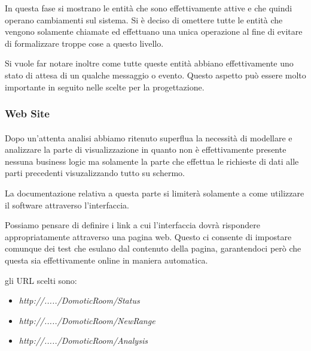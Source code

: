 In questa fase si mostrano le entit\`a che sono effettivamente attive e che quindi operano cambiamenti sul sistema. Si \`e deciso di omettere tutte le entit\`a che vengono solamente chiamate ed effettuano una unica operazione al fine di evitare di formalizzare troppe cose a questo livello.

Si vuole far notare inoltre come tutte queste entit\`a abbiano effettivamente uno stato di attesa di un qualche messaggio o evento. Questo aspetto pu\`o essere molto importante in seguito nelle scelte per la progettazione.

\newpage

\subsubsection{Web Site}

\paragraph{}Dopo un'attenta analisi abbiamo ritenuto superflua la necessit\`a di modellare e analizzare la parte di visualizzazione in quanto non \`e effettivamente presente nessuna business logic ma solamente la parte che effettua le richieste di dati alle parti precedenti visuzalizzando tutto su schermo.

La documentazione relativa a questa parte si limiter\`a solamente a come utilizzare il software attraverso l'interfaccia.

Possiamo pensare di definire i link a cui l'interfaccia dovr\`a rispondere appropriatamente attraverso una pagina web. Questo ci consente di impostare comunque dei test che esulano dal contenuto della pagina, garantendoci per\`o che questa sia effettivamente online in maniera automatica.

gli URL scelti sono:
\begin{itemize}
  \item \textit{http://...../DomoticRoom/Status}
  \item \textit{http://...../DomoticRoom/NewRange}
  \item \textit{http://...../DomoticRoom/Analysis}
\end{itemize}
